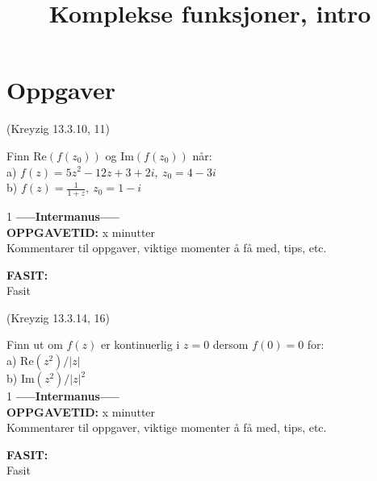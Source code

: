 \documentclass[a4paper,norsk,11pt]{style_interaktiv}
\title{Komplekse funksjoner, intro}
\begin{document}

\maketitle

\def\LF{0}  %





\section*{Oppgaver}

\begin{oppgave}{1}
(Kreyzig 13.3.10, 11)

Finn $\mathrm{Re}(f(z_0))$ og $\mathrm{Im}(f(z_0))$ når:\\
a) $f(z) = 5z^2 - 12z + 3 + 2i,\ z_0 = 4 - 3i$\\
b) $f(z) = \frac{1}{1 + z},\ z_0 = 1 - i$

\if\LF1
\textbf{-----Intermanus-----}\\
\textbf{OPPGAVETID: } x minutter\\
Kommentarer til oppgaver, viktige momenter å få med, tips, etc.

\textbf{FASIT: }\\
Fasit
\fi
\end{oppgave}


\begin{oppgave}{2}
(Kreyzig 13.3.14, 16)

Finn ut om $f(z)$ er kontinuerlig i $z = 0$ dersom $f(0) = 0$ for:\\
a) $\mathrm{Re}(z^2) / |z| $\\
b) $\mathrm{Im}(z^2) / |z|^2 $\\

\if\LF1
\textbf{-----Intermanus-----}\\
\textbf{OPPGAVETID: } x minutter\\
Kommentarer til oppgaver, viktige momenter å få med, tips, etc.

\textbf{FASIT: }\\
Fasit
\fi
\end{oppgave}
\end{document}
